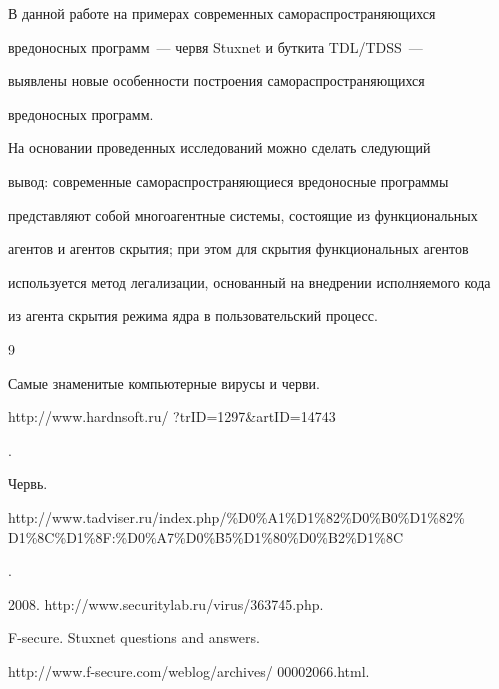     В данной работе на примерах современных самораспространяющихся 


вредоносных программ~--- червя {Stuxnet} и буткита {TDL/TDSS}~--- 


выявлены новые особенности построения самораспространяющихся 


вредоносных программ. 


     


     На основании проведенных исследований можно сделать следующий 


вывод: современные самораспространяющиеся вредоносные программы 


представляют собой многоагентные системы, состоящие из функциональных 


агентов и агентов скрытия; при этом для скрытия функциональных агентов 


используется метод легализации, основанный на внедрении исполняемого кода 


из агента скрытия режима ядра в пользовательский процесс.


    


{\small\frenchspacing


{%




\begin{thebibliography}{9}







Самые знаменитые компьютерные вирусы и черви. {\sf 


http://www.hardnsoft.ru/ ?trID=1297\&artID=14743}.







Червь. {\sf 


http://www.tadviser.ru/index.php/\%D0\%A1\%D1\%82\%D0\%B0\%D1\%82\% D1\%8C\%D1\%8F:\%D0\%A7\%D0\%B5\%D1\%80\%D0\%B2\%D1\%8C}.









2008. {\sf http://www.securitylab.ru/virus/363745.php}.


 


 \label{end\stat}







F-secure. Stuxnet questions and answers.


{\sf http://www.f-secure.com/weblog/archives/ 00002066.html}.


\end{thebibliography}


}


}    


